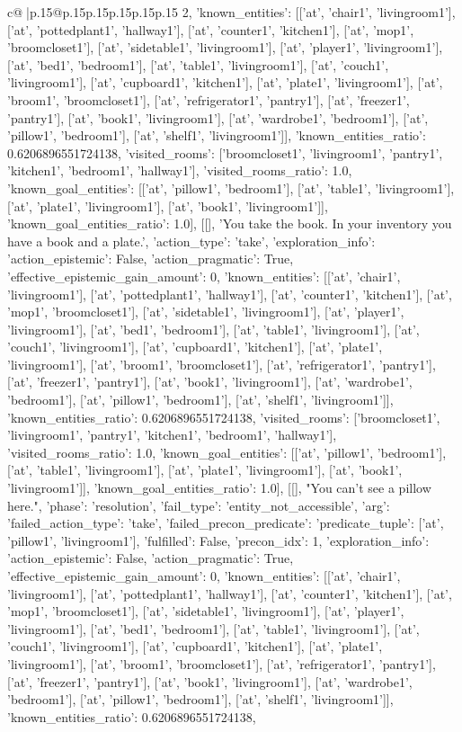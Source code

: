 \documentclass{article}
\begin{document}
{\begin{supertabular}{c@{$\;$}|p{.15\linewidth}@{}p{.15\linewidth}p{.15\linewidth}p{.15\linewidth}p{.15\linewidth}p{.15\linewidth}}
{{{2, 'known_entities': [['at', 'chair1', 'livingroom1'], ['at', 'pottedplant1', 'hallway1'], ['at', 'counter1', 'kitchen1'], ['at', 'mop1', 'broomcloset1'], ['at', 'sidetable1', 'livingroom1'], ['at', 'player1', 'livingroom1'], ['at', 'bed1', 'bedroom1'], ['at', 'table1', 'livingroom1'], ['at', 'couch1', 'livingroom1'], ['at', 'cupboard1', 'kitchen1'], ['at', 'plate1', 'livingroom1'], ['at', 'broom1', 'broomcloset1'], ['at', 'refrigerator1', 'pantry1'], ['at', 'freezer1', 'pantry1'], ['at', 'book1', 'livingroom1'], ['at', 'wardrobe1', 'bedroom1'], ['at', 'pillow1', 'bedroom1'], ['at', 'shelf1', 'livingroom1']], 'known_entities_ratio': 0.6206896551724138, 'visited_rooms': ['broomcloset1', 'livingroom1', 'pantry1', 'kitchen1', 'bedroom1', 'hallway1'], 'visited_rooms_ratio': 1.0, 'known_goal_entities': [['at', 'pillow1', 'bedroom1'], ['at', 'table1', 'livingroom1'], ['at', 'plate1', 'livingroom1'], ['at', 'book1', 'livingroom1']], 'known_goal_entities_ratio': 1.0}}], [[], 'You take the book. In your inventory you have a book and a plate.', {'action_type': 'take', 'exploration_info': {'action_epistemic': False, 'action_pragmatic': True, 'effective_epistemic_gain_amount': 0, 'known_entities': [['at', 'chair1', 'livingroom1'], ['at', 'pottedplant1', 'hallway1'], ['at', 'counter1', 'kitchen1'], ['at', 'mop1', 'broomcloset1'], ['at', 'sidetable1', 'livingroom1'], ['at', 'player1', 'livingroom1'], ['at', 'bed1', 'bedroom1'], ['at', 'table1', 'livingroom1'], ['at', 'couch1', 'livingroom1'], ['at', 'cupboard1', 'kitchen1'], ['at', 'plate1', 'livingroom1'], ['at', 'broom1', 'broomcloset1'], ['at', 'refrigerator1', 'pantry1'], ['at', 'freezer1', 'pantry1'], ['at', 'book1', 'livingroom1'], ['at', 'wardrobe1', 'bedroom1'], ['at', 'pillow1', 'bedroom1'], ['at', 'shelf1', 'livingroom1']], 'known_entities_ratio': 0.6206896551724138, 'visited_rooms': ['broomcloset1', 'livingroom1', 'pantry1', 'kitchen1', 'bedroom1', 'hallway1'], 'visited_rooms_ratio': 1.0, 'known_goal_entities': [['at', 'pillow1', 'bedroom1'], ['at', 'table1', 'livingroom1'], ['at', 'plate1', 'livingroom1'], ['at', 'book1', 'livingroom1']], 'known_goal_entities_ratio': 1.0}}], [[], "You can't see a pillow here.", {'phase': 'resolution', 'fail_type': 'entity_not_accessible', 'arg': {'failed_action_type': 'take', 'failed_precon_predicate': {'predicate_tuple': ['at', 'pillow1', 'livingroom1'], 'fulfilled': False, 'precon_idx': 1}}, 'exploration_info': {'action_epistemic': False, 'action_pragmatic': True, 'effective_epistemic_gain_amount': 0, 'known_entities': [['at', 'chair1', 'livingroom1'], ['at', 'pottedplant1', 'hallway1'], ['at', 'counter1', 'kitchen1'], ['at', 'mop1', 'broomcloset1'], ['at', 'sidetable1', 'livingroom1'], ['at', 'player1', 'livingroom1'], ['at', 'bed1', 'bedroom1'], ['at', 'table1', 'livingroom1'], ['at', 'couch1', 'livingroom1'], ['at', 'cupboard1', 'kitchen1'], ['at', 'plate1', 'livingroom1'], ['at', 'broom1', 'broomcloset1'], ['at', 'refrigerator1', 'pantry1'], ['at', 'freezer1', 'pantry1'], ['at', 'book1', 'livingroom1'], ['at', 'wardrobe1', 'bedroom1'], ['at', 'pillow1', 'bedroom1'], ['at', 'shelf1', 'livingroom1']], 'known_entities_ratio': 0.6206896551724138, }}}
\end{supertabular}}
\end{document}
